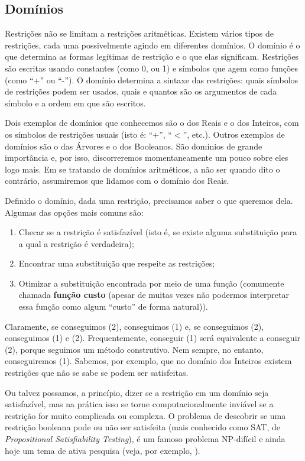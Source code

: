 \documentclass{article}
\theoremstyle{remark}
\theoremstyle{theorem}
\begin{document}
\subsection{Domínios}

Restrições não se limitam a restrições aritméticas. Existem vários tipos de restrições, cada uma possivelmente agindo em diferentes domínios.
O domínio é o que determina as formas legítimas de restrição e o que elas significam. Restrições são escritas usando constantes (como 0, ou 1) e símbolos que agem como funções (como ``+'' ou ``-''). O domínio determina a sintaxe das restrições: quais símbolos de restrições podem ser usados, quais e quantos são os argumentos de cada símbolo e a ordem em que são escritos.

Dois exemplos de domínios que conhecemos são o dos Reais e o dos Inteiros, com os símbolos de restrições usuais (isto é: ``+'', ``$<$'', etc.). Outros exemplos de domínios são o das Árvores e o dos Booleanos. São domínios de grande importância e, por isso, discorreremos momentaneamente um pouco sobre eles logo mais. Em se tratando de domínios aritméticos, a não ser quando dito o contrário, assumiremos que lidamos com o domínio dos Reais.

Definido o domínio, dada uma restrição, precisamos saber o que queremos dela. Algumas das opções mais comuns são:
  \begin{enumerate}
    \item Checar se a restrição é satisfazível (isto é, se existe alguma substituição para a qual a restrição é verdadeira);
    \item Encontrar uma substituição que respeite as restrições;
    \item Otimizar a substituição encontrada por meio de uma função (comumente chamada \textbf{função custo} (apesar de muitas vezes não podermos interpretar essa função como algum ``custo'' de forma natural)).
  \end{enumerate}

  Claramente, se conseguimos (2), conseguimos (1) e, se conseguimos (2), conseguimos (1) e (2). Frequentemente, conseguir (1) será equivalente a conseguir (2), porque seguimos um método construtivo. Nem sempre, no entanto, conseguiremos (1). Sabemos, por exemplo, que no domínio dos Inteiros existem restrições que não se sabe se podem ser satisfeitas.

  Ou talvez possamos, a princípio, dizer se a restrição em um domínio seja satisfazível, mas na prática isso se torne computacionalmente inviável se a
restrição for muito complicada ou complexa. O problema de descobrir se uma restrição booleana pode ou não ser satisfeita (mais conhecido como SAT, de \textit{Propositional Satisfiability Testing}), é um famoso problema NP-difícil e ainda hoje um tema de ativa pesquisa (veja, por exemplo, \cite{sat}).
\end{document}
